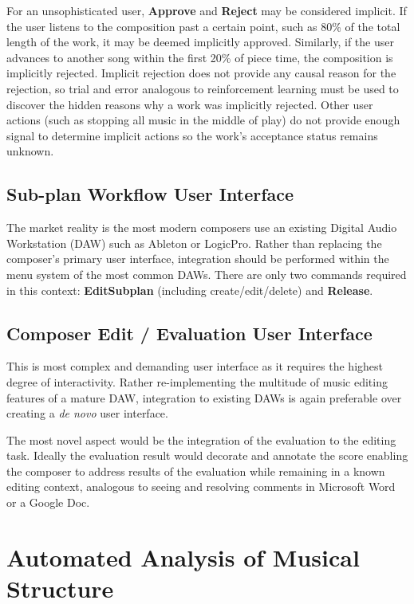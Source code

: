 \documentclass[final,authoryear,5p,times,twocolumn]{elsarticle}
\begin{document}
For an unsophisticated user, \textbf{Approve} and \textbf{Reject} may be considered implicit. If the user listens to the composition past a certain point, such as 80\% of the total length of the work, it may be deemed implicitly approved. Similarly, if the user advances to another song within the first 20\% of piece time, the composition is implicitly rejected. Implicit rejection does not provide any causal reason for the rejection, so trial and error analogous to reinforcement learning must be used to discover the hidden reasons why a work was implicitly rejected. Other user actions (such as stopping all music in the middle of play) do not provide enough signal to determine implicit actions so the work's acceptance status remains unknown.

\subsection{Sub-plan Workflow User Interface}

The market reality is the most modern composers use an existing Digital Audio Workstation (DAW) such as Ableton or LogicPro. Rather than replacing the composer's primary user interface, integration should be performed within the menu system of the most common DAWs. There are only two commands required in this context: \textbf{EditSubplan} (including create/edit/delete) and \textbf{Release}. 

\subsection{Composer Edit / Evaluation User Interface}

This is most complex and demanding user interface as it requires the highest degree of interactivity. Rather re-implementing the multitude of music editing features of a mature DAW, integration to existing DAWs is again preferable over creating a \textit{de novo} user interface. 

The most novel aspect would be the integration of the evaluation to the editing task. Ideally the evaluation result would decorate and annotate the score enabling the composer to address results of the evaluation while remaining in a known editing context, analogous to seeing and resolving comments in Microsoft Word or a Google Doc.

\section{Automated Analysis of Musical Structure}
\end{document}
